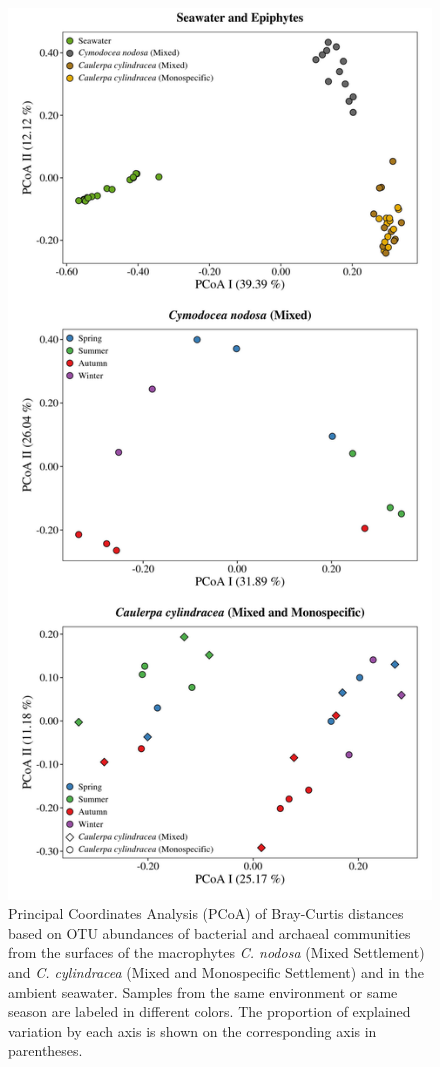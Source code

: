 \documentclass[12pt,]{article}
\begin{document}
\begin{figure}[H]

{\centering \includegraphics[width=0.55\linewidth]{../results/figures/pcoa_figure} 

}

\caption{Principal Coordinates Analysis (PCoA) of Bray-Curtis distances based on OTU abundances of bacterial and archaeal communities from the surfaces of the macrophytes \textit{C. nodosa} (Mixed Settlement) and \textit{C. cylindracea} (Mixed and Monospecific Settlement) and in the ambient seawater. Samples from the same environment or same season are labeled in different colors. The proportion of explained variation by each axis is shown on the corresponding axis in parentheses.\label{pcoa}}\label{fig:unnamed-chunk-3}
\end{figure}
\end{document}
